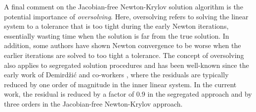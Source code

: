 \documentclass[sn-mathphys,Numbered]{sn-jnl}%
\begin{document}
A final comment on the Jacobian-free Newton-Krylov solution algorithm is the potential importance of \emph{oversolving}.
Here, oversolving refers to solving the linear system to a tolerance that is too tight during the early Newton iterations, essentially wasting time when the solution is far from the true solution.
In addition, some authors %
\cite{Knoll2004} have shown Newton convergence to be worse when the earlier iterations are solved to too tight a tolerance.
The concept of oversolving also applies to segregated solution procedures and has been well-known since the early work of Demird\v{z}i\'{c} and co-workers \cite{Demirdzic1995}, where the residuals are typically reduced by one order of magnitude in the inner linear system.
In the current work, the residual is reduced by a factor of 0.9 in the segregated approach and by three orders in the Jacobian-free Newton-Krylov approach.



\end{document}
